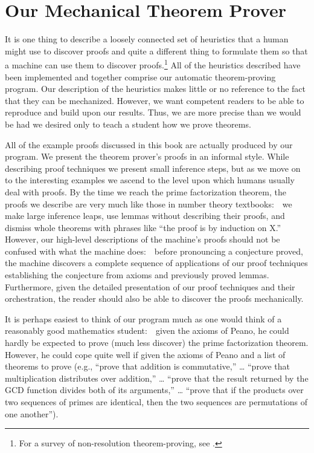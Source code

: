 \documentclass[11pt]{book}
\newcommand{\pubdefaulttextsize}{\large}
\begin{document}
\section{Our Mechanical Theorem Prover}
\pubdefaulttextsize
It is one thing to describe a loosely connected
set of heuristics that a human might use to discover proofs and quite
a different thing to formulate them so that a machine can use them to discover proofs.\footnote{For a survey of non-resolution theorem-proving, see \cite{BLEDSOESURVEY}.}
All of the heuristics described have been implemented and together 
comprise our automatic theorem-proving program.
Our description of the heuristics  makes little or no
reference to the fact that they can be mechanized.  However, we want
competent readers to be able to reproduce and build upon
our results.  Thus, we are more precise than we would be
had we desired only to teach a student how we prove theorems.

All of the example proofs discussed in this book are actually
produced by our program.
We present the theorem prover's proofs in an informal
style.  While describing proof techniques we present small
inference steps, but as we move on to the interesting examples
we ascend to the level upon which humans usually deal with
proofs.  By the time we reach the prime factorization theorem,
the proofs we describe are very much like those in number
theory textbooks:~~we make large inference leaps, use lemmas
without describing their proofs, and dismiss whole theorems
with phrases like ``the proof is by induction on X.''
However, our high-level descriptions of the machine's proofs
should not be confused with what the machine does:~~before pronouncing a conjecture proved, the machine
discovers a complete sequence of applications of our proof techniques
establishing the conjecture from axioms and previously proved lemmas.
Furthermore, given the detailed presentation of our proof techniques
and their orchestration, the reader should also be able to discover
the proofs mechanically.

It is perhaps easiest to think of our program much as one would think of a
reasonably good mathematics student:~~given the axioms of
Peano, he could hardly be expected to prove (much less discover) the
prime factorization theorem.  However, he could  cope quite well if given
the axioms of Peano and a list of theorems to prove
(e.g., ``prove that addition is commutative,'' \ldots{} ``prove that multiplication distributes over
addition,'' \ldots{} ``prove that the result returned by the GCD function divides both of
its arguments,'' \ldots{} ``prove that if the products over two sequences of
primes are identical, then the two sequences are
permutations of one another'').
\end{document}
